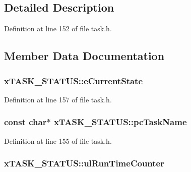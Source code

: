 \subsection{Detailed Description}


Definition at line 152 of file task.\+h.



\subsection{Member Data Documentation}
\subsubsection[{\texorpdfstring{e\+Current\+State}{eCurrentState}}]{ x\+T\+A\+S\+K\+\_\+\+S\+T\+A\+T\+U\+S\+::e\+Current\+State}\hypertarget{structx_t_a_s_k___s_t_a_t_u_s_a727e904e3afe49472b0fc6a4e96439cb}{}\label{structx_t_a_s_k___s_t_a_t_u_s_a727e904e3afe49472b0fc6a4e96439cb}


Definition at line 157 of file task.\+h.

\subsubsection[{\texorpdfstring{pc\+Task\+Name}{pcTaskName}}]{\setlength{\rightskip}{0pt plus 5cm}const char$\ast$ x\+T\+A\+S\+K\+\_\+\+S\+T\+A\+T\+U\+S\+::pc\+Task\+Name}\hypertarget{structx_t_a_s_k___s_t_a_t_u_s_ad272663e2560bd9ea088384a39ba6192}{}\label{structx_t_a_s_k___s_t_a_t_u_s_ad272663e2560bd9ea088384a39ba6192}


Definition at line 155 of file task.\+h.

\subsubsection[{\texorpdfstring{ul\+Run\+Time\+Counter}{ulRunTimeCounter}}]{ x\+T\+A\+S\+K\+\_\+\+S\+T\+A\+T\+U\+S\+::ul\+Run\+Time\+Counter}\hypertarget{structx_t_a_s_k___s_t_a_t_u_s_a92ab83f4f376c255dedf8e06a78261f7}{}\label{structx_t_a_s_k___s_t_a_t_u_s_a92ab83f4f376c255dedf8e06a78261f7}


